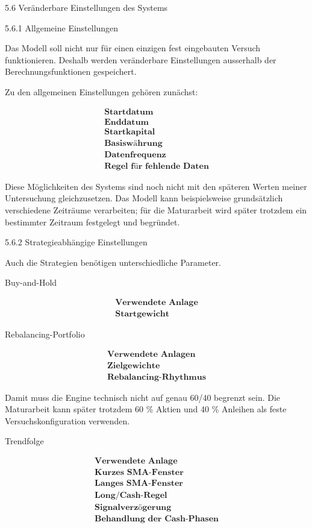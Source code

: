 \documentclass[
  ngerman,
  a4paper,
  DIV=11,
  oneside]{scrreprt}
\begin{document}
5.6 Veränderbare Einstellungen des Systems

5.6.1 Allgemeine Einstellungen

Das Modell soll nicht nur für einen einzigen fest eingebauten Versuch
funktionieren. Deshalb werden veränderbare Einstellungen ausserhalb der
Berechnungsfunktionen gespeichert.

Zu den allgemeinen Einstellungen gehören zunächst:

\[
\begin{array}{l}
\textbf{Startdatum} \\
\textbf{Enddatum} \\
\textbf{Startkapital} \\
\textbf{Basiswährung} \\
\textbf{Datenfrequenz} \\
\textbf{Regel für fehlende Daten}
\end{array}
\]

Diese Möglichkeiten des Systems sind noch nicht mit den späteren Werten
meiner Untersuchung gleichzusetzen. Das Modell kann beispielsweise
grundsätzlich verschiedene Zeiträume verarbeiten; für die Maturarbeit
wird später trotzdem ein bestimmter Zeitraum festgelegt und begründet.

5.6.2 Strategieabhängige Einstellungen

Auch die Strategien benötigen unterschiedliche Parameter.

Buy-and-Hold

\[
\begin{array}{l}
\textbf{Verwendete Anlage} \\
\textbf{Startgewicht}
\end{array}
\]

Rebalancing-Portfolio

\[
\begin{array}{l}
\textbf{Verwendete Anlagen} \\
\textbf{Zielgewichte} \\
\textbf{Rebalancing-Rhythmus}
\end{array}
\]

Damit muss die Engine technisch nicht auf genau 60/40 begrenzt sein. Die
Maturarbeit kann später trotzdem 60 \% Aktien und 40 \% Anleihen als
feste Versuchskonfiguration verwenden.

Trendfolge

\[
\begin{array}{l}
\textbf{Verwendete Anlage} \\
\textbf{Kurzes SMA-Fenster} \\
\textbf{Langes SMA-Fenster} \\
\textbf{Long/Cash-Regel} \\
\textbf{Signalverzögerung} \\
\textbf{Behandlung der Cash-Phasen}
\end{array}
\]
\end{document}
